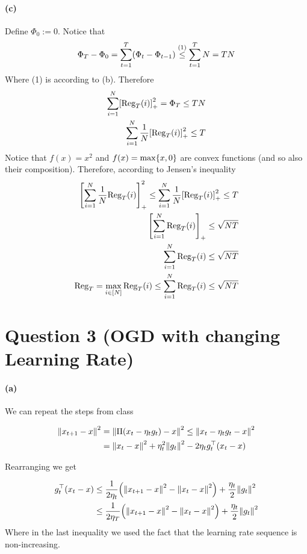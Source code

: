 \documentclass{article}
\DeclarePairedDelimiter\br{(}{)}%
\DeclarePairedDelimiter\brs{[}{]}%
\DeclarePairedDelimiter\brc{\{}{\}}%
\DeclarePairedDelimiter\norm{\lVert}{\rVert}%
\newcommand{\Reg}{\text{Reg}}
\begin{document}
\paragraph{(c)}
Define $\Phi_0:=0$.
Notice that
\begin{align*} 
\Phi_T - \Phi_0 = \sum_{t=1}^{T}\br*{ \Phi_{t}-\Phi_{t-1}}  \stackrel{(1)}{\leq} \sum_{t=1}^{T} N = T N
\end{align*}
Where (1) is according to (b).
Therefore
\begin{align*} 
\sum_{i=1}^{N} \brs*{\Reg_T(i)}_{+}^2  = \Phi_T \leq T N \\
\sum_{i=1}^{N} \frac{1}{N} \brs*{\Reg_T(i)}_{+}^2  \leq T 
\end{align*}
Notice that $f(x)=x^2$ and $f(x)=\max \brc*{x,0}$ are convex functions (and so also their composition). 
Therefore, according to Jensen's inequality
\begin{align*} 
\brs*{\sum_{i=1}^{N} \frac{1}{N} \Reg_T(i)}_{+}^2 \leq \sum_{i=1}^{N} \frac{1}{N} \brs*{\Reg_T(i)}_{+}^2  \leq T  \\
\brs*{\sum_{i=1}^{N} \Reg_T(i)}_{+} \leq \sqrt{NT}
 \\
\sum_{i=1}^{N} \Reg_T(i) \leq \sqrt{NT}
 \\
\Reg_T = \max_{i \in [N]}  \Reg_T(i)  \leq \sum_{i=1}^{N} \Reg_T(i) \leq \sqrt{NT}
\end{align*}
\section{Question 3 (OGD with changing Learning Rate)}
\paragraph{(a)}
We can repeat the steps from class

\begin{align*}
    \norm*{x_{t+1}-x}^2 &=  \norm*{\Pi (x_{t} - \eta_t g_t)-x}^2
    \leq  \norm*{ x_{t} - \eta_t g_t-x}^2 \\
    &=  \norm*{x_t-x}^2 + \eta_t^2\norm*{g_t}^2 -2\eta_t g_t^\top(x_t-x)
\end{align*}

Rearranging we get

\begin{align*}
g_t^\top(x_t-x) &\leq \frac{1}{2\eta_t} \br*{\norm*{x_{t+1}-x}^2 - \norm*{x_t-x}^2 } + \frac{\eta_t}{2} \norm*{g_t}^2 \\
& \leq \frac{1}{2\eta_T} \br*{\norm*{x_{t+1}-x}^2 - \norm*{x_t-x}^2 }+ \frac{\eta_t}{2}  \norm*{g_t}^2 \\
\end{align*}
Where in the last inequality we used the fact that the learning rate sequence is non-increasing.
\end{document}

